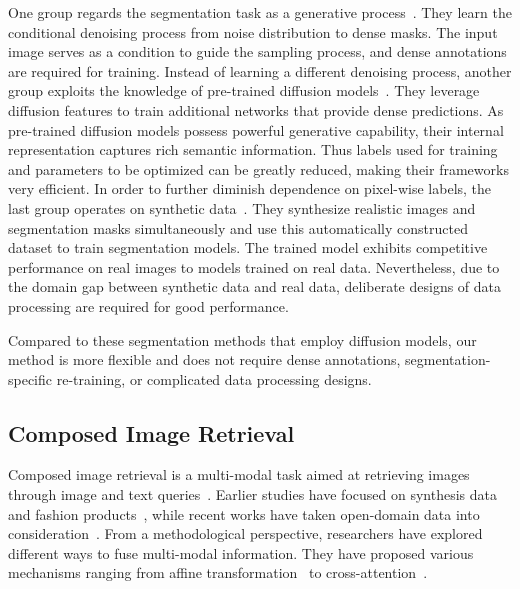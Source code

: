 \documentclass[letterpaper]{article} \usepackage[submission]{aaai24}  \usepackage{times}  \usepackage{helvet}  \usepackage{courier}  \usepackage[hyphens]{url}  \usepackage{graphicx} \urlstyle{rm} \def\UrlFont{\rm}  \usepackage{natbib}  \usepackage{caption} \frenchspacing  \setlength{\pdfpagewidth}{8.5in} \setlength{\pdfpageheight}{11in} \usepackage{algorithm}
\begin{document}
One group regards the segmentation task as a generative process~\cite{diffusionimplicitseg}.
They learn the conditional denoising process from noise distribution to dense masks.
The input image serves as a condition to guide the sampling process, and dense annotations are required for training.
Instead of learning a different denoising process, another group exploits the knowledge of pre-trained diffusion models~\cite{ddpmseg, VPD}.
They leverage diffusion features to train additional networks that provide dense predictions.
As pre-trained diffusion models possess powerful generative capability, their internal representation captures rich semantic information.
Thus labels used for training and parameters to be optimized can be greatly reduced, making their frameworks very efficient.
In order to further diminish dependence on pixel-wise labels, the last group operates on synthetic data~\cite{grounddiff, diffumask}.
They synthesize realistic images and segmentation masks simultaneously and use this automatically constructed dataset to train segmentation models.
The trained model exhibits competitive performance on real images to models trained on real data.
Nevertheless, due to the domain gap between synthetic data and real data, deliberate designs of data processing are required for good performance.

Compared to these segmentation methods that employ diffusion models, our method is more flexible and does not require dense annotations, segmentation-specific re-training, or complicated data processing designs.


\subsection{Composed Image Retrieval}
\label{sec:CIR}

Composed image retrieval is a multi-modal task aimed at retrieving images through image and text queries~\cite{CIR}.
Earlier studies have focused on synthesis data~\cite{CIR} and fashion products~\cite{fashioniq}, while recent works have taken open-domain data into consideration~\cite{CIRR}.
From a methodological perspective, researchers have explored different ways to fuse multi-modal information.
They have proposed various mechanisms ranging from affine transformation~\cite{film} to cross-attention~\cite{CIRlocal}.
\end{document}
